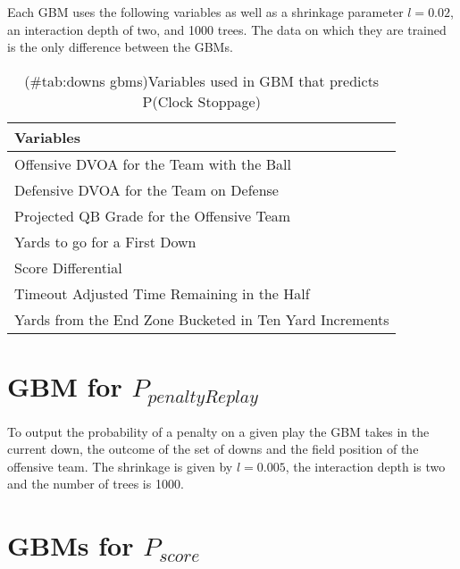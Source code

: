 \documentclass[12pt,twoside]{dukestatscithesis}
\begin{document}
Each GBM uses the following variables as well as a shrinkage parameter \(l = 0.02\), an interaction depth of two, and 1000 trees. The data on which they are trained is the only difference between the GBMs.
\begin{longtable}[t]{l}
\caption{(\#tab:downs gbms)Variables used in GBM that predicts P(Clock Stoppage)}\\
\toprule
Variables\\
\midrule
Offensive DVOA for the Team with the Ball\\
Defensive DVOA for the Team on Defense\\
Projected QB Grade for the Offensive Team\\
Yards to go for a First Down\\
Score Differential\\
\addlinespace
Timeout Adjusted Time Remaining in the Half\\
Yards from the End Zone Bucketed in Ten Yard Increments\\
\bottomrule
\end{longtable}
\hypertarget{gbm-for-p_penaltyreplay}{%
\section{\texorpdfstring{GBM for \(P_{penaltyReplay}\)}{GBM for P\_\{penaltyReplay\}}}\label{gbm-for-p_penaltyreplay}}

To output the probability of a penalty on a given play the GBM takes in the current down, the outcome of the set of downs and the field position of the offensive team. The shrinkage is given by \(l = 0.005\), the interaction depth is two and the number of trees is 1000.

\hypertarget{gbms-for-p_score}{%
\section{\texorpdfstring{GBMs for \(P_{score}\)}{GBMs for P\_\{score\}}}\label{gbms-for-p_score}}
\end{document}
